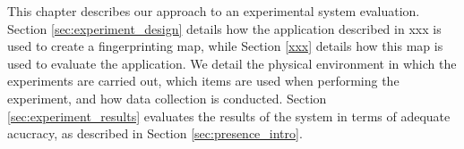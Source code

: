 This chapter describes our approach to an experimental system evaluation.
Section \ref{sec:experiment_design} details how the application described in xxx is used to create a fingerprinting map, while Section \ref{xxx} details how this map is used to evaluate the application.
We detail the physical environment in which the experiments are carried out, which items are used when performing the experiment, and how data collection is conducted.
Section \ref{sec:experiment_results} evaluates the results of the system in terms of adequate acucracy, as described in Section \ref{sec:presence_intro}. 